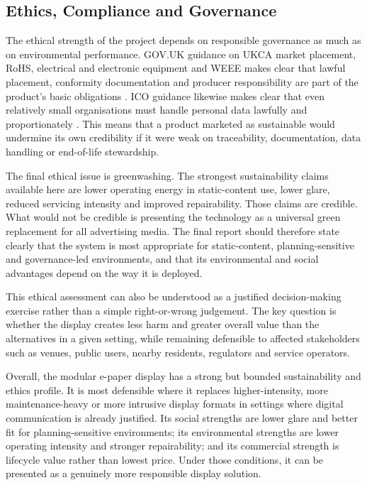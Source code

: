 \documentclass[11pt,a4paper]{article}
\begin{document}
\subsection{Ethics, Compliance and Governance}

The ethical strength of the project depends on responsible governance as much as on environmental performance. GOV.UK guidance on UKCA market placement, RoHS, electrical and electronic equipment and WEEE makes clear that lawful placement, conformity documentation and producer responsibility are part of the product's basic obligations \cite{ref19}\cite{ref20}\cite{ref21}\cite{ref22}. ICO guidance likewise makes clear that even relatively small organisations must handle personal data lawfully and proportionately \cite{ref29}. This means that a product marketed as sustainable would undermine its own credibility if it were weak on traceability, documentation, data handling or end-of-life stewardship.

The final ethical issue is greenwashing. The strongest sustainability claims available here are lower operating energy in static-content use, lower glare, reduced servicing intensity and improved repairability. Those claims are credible. What would not be credible is presenting the technology as a universal green replacement for all advertising media. The final report should therefore state clearly that the system is most appropriate for static-content, planning-sensitive and governance-led environments, and that its environmental and social advantages depend on the way it is deployed.

This ethical assessment can also be understood as a justified decision-making exercise rather than a simple right-or-wrong judgement. The key question is whether the display creates less harm and greater overall value than the alternatives in a given setting, while remaining defensible to affected stakeholders such as venues, public users, nearby residents, regulators and service operators.

Overall, the modular e-paper display has a strong but bounded sustainability and ethics profile. It is most defensible where it replaces higher-intensity, more maintenance-heavy or more intrusive display formats in settings where digital communication is already justified. Its social strengths are lower glare and better fit for planning-sensitive environments; its environmental strengths are lower operating intensity and stronger repairability; and its commercial strength is lifecycle value rather than lowest price. Under those conditions, it can be presented as a genuinely more responsible display solution.
\end{document}
